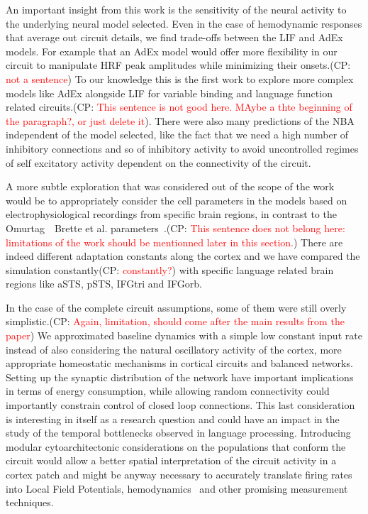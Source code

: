 \documentclass[10pt]{article}
\newcommand{\noteCP}[1]{(CP: \textcolor{red}{#1})}
\begin{document}
{\label{160055}}

An important insight from this work is the sensitivity of the neural activity to the underlying neural model selected.
Even in the case of hemodynamic responses that average out circuit details, we find trade-offs between the LIF and AdEx models.
For example that an AdEx model would offer more flexibility in our circuit to manipulate HRF peak amplitudes while minimizing their onsets.\noteCP{not a sentence}
To our knowledge this is the first work to explore more complex models like AdEx alongside LIF for variable binding and language function related circuits.\noteCP{This sentence is not good here. MAybe a thte beginning of the paragraph?, or just delete it}.
There were also many predictions of the NBA independent of the model selected, like the fact that we need a high number of inhibitory connections and so of inhibitory activity to avoid uncontrolled regimes of self excitatory activity dependent on the connectivity of the circuit.

A more subtle exploration that was considered out of the scope of the work would be to appropriately consider the cell parameters in the models based on electrophysiological recordings from specific brain regions, in contrast to the Omurtag~\cite{omurtag2000simulation}~Brette et al. parameters~\cite{Brette_2005}.\noteCP{This sentence does not belong here: limitations of the work should be mentionned later in this section.}
There are indeed different adaptation constants along the cortex and we have compared the simulation constantly\noteCP{constantly?} with specific language related brain regions like aSTS, pSTS, IFGtri and IFGorb.

In the case of the complete circuit assumptions, some of them were still overly simplistic.\noteCP{Again, limitation, should come after the main results from the paper}
We approximated baseline dynamics with a simple low constant input rate instead of also considering the natural oscillatory activity of the cortex, more appropriate homeostatic mechanisms in cortical circuits\cite{turrigiano2011too} and balanced networks\cite{Wolf_2014}.
Setting up the synaptic distribution of the network have important implications in terms of energy consumption, while allowing random connectivity could importantly constrain control of closed loop connections.
This last consideration is interesting in itself as a research question and could have an impact in the study of the temporal bottlenecks observed in language processing\cite{Vagharchakian_2012}.
Introducing modular cytoarchitectonic considerations on the populations that conform the circuit would allow a better spatial interpretation of the circuit activity in a cortex patch and might be anyway necessary to accurately translate firing rates into Local Field Potentials\cite{Mazzoni_2015,Hagen_2015}, hemodynamics~\cite{Buxton_2004} and other promising measurement techniques.
\end{document}
